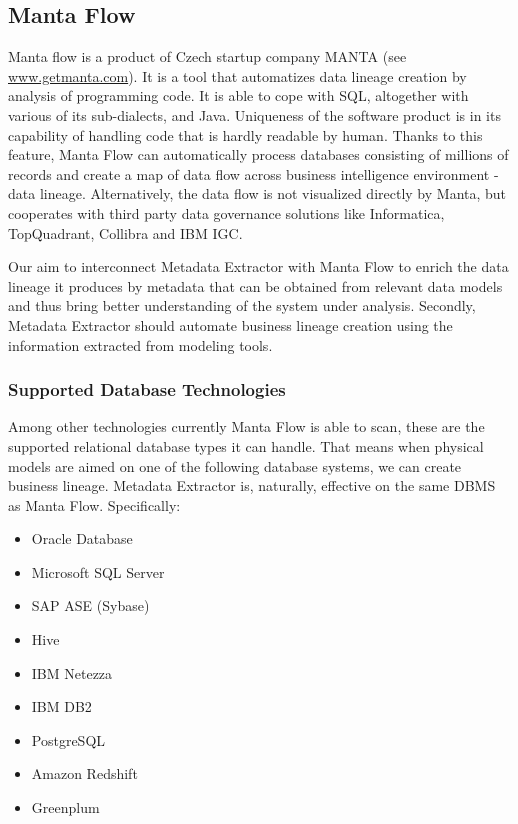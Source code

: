 \subsection{Manta Flow}

Manta flow is a product of Czech startup company MANTA (see \url{www.getmanta.com}). It is a tool that automatizes data lineage creation by analysis of programming code. It is able to cope with SQL, altogether with various of its sub-dialects, and Java. Uniqueness of the software product is in its capability of handling code that is hardly readable by human. Thanks to this feature, Manta Flow can automatically process databases consisting of millions of records and create a map of data flow across business intelligence environment - data lineage.
Alternatively, the data flow is not visualized directly by Manta, but cooperates with third party data governance solutions like Informatica, TopQuadrant, Collibra and IBM IGC.

Our aim to interconnect Metadata Extractor with Manta Flow to enrich the data lineage it produces by metadata that can be obtained from relevant data models and thus bring better understanding of the system under analysis. 
Secondly, Metadata Extractor should automate business lineage creation using the information extracted from modeling tools.

\subsubsection{Supported Database Technologies}
Among other technologies currently Manta Flow is able to scan, these are the supported relational database types it can handle. 
That means when physical models are aimed on one of the following database systems, we can create business lineage. Metadata Extractor is, naturally, effective on the same DBMS as Manta Flow. Specifically:
\begin{itemize}
	\item Oracle Database
	\item Microsoft SQL Server
	\item SAP ASE (Sybase)
	\item Hive
	\item IBM Netezza
	\item IBM DB2
	\item PostgreSQL
	\item Amazon Redshift
	\item Greenplum
\end{itemize}

